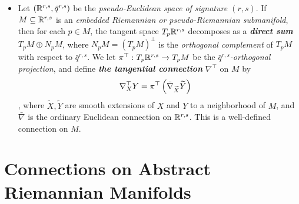 \documentclass[11pt]{article}
\begin{document}
\begin{itemize}
\item \begin{remark}
Let $({\mathbb R}^{r,s}, \bar{q}^{r,s})$ be the \emph{pseudo-Euclidean space of signature $(r,s)$}. If $M \subseteq {\mathbb R}^{r,s}$ is an \emph{embedded Riemannian or pseudo-Riemannian submanifold}, then for each $p \in M$, the tangent space $T_{p}{\mathbb R}^{r,s}$ decomposes as a \emph{\textbf{direct sum}} $T_{p}M \oplus N_{p}M$, where
$N_{p}M =(T_{p}M)^{\bot}$ is the \emph{orthogonal complement} of $T_{p}M$ with respect to $\bar{q}^{r,s}$. We let $\pi^{\top}: T_{p}{\mathbb R}^{r,s} \rightarrow T_{p}M$ be the \emph{$\bar{q}^{r,s}$-orthogonal projection}, and define \emph{\textbf{the tangential connection}} $\nabla^{\top}$ on $M$ by
\begin{align*}
\nabla^{\top}_{X}Y &= \pi^{\top}\left(\bar{\nabla}_{\widetilde{X}}\widetilde{Y}\right)
\end{align*},
where $\widetilde{X}, \widetilde{Y}$ are smooth extensions of $X$ and $Y$ to a neighborhood of $M$, and $\bar{\nabla}$ is the ordinary Euclidean connection on ${\mathbb R}^{r,s}$. This is a well-defined connection on $M$.
\end{remark}
\end{itemize}
\section{Connections on Abstract Riemannian Manifolds}
\end{document}
